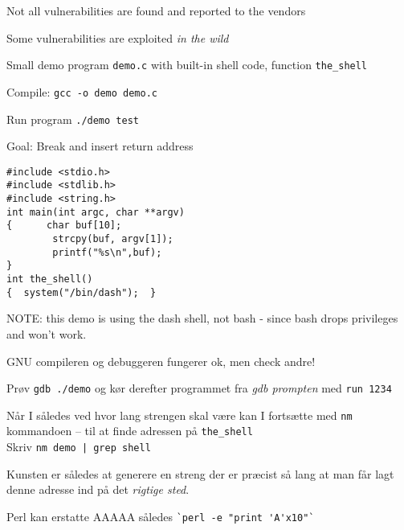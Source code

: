 \documentclass[Screen16to9,17pt]{foils}
\begin{document}
\begin{list2}
\item Not all vulnerabilities are found and reported to the vendors
\item Some vulnerabilities are exploited \emph{in the wild}
\end{list2}



\begin{list2}
\item Small demo program \verb+demo.c+ with built-in shell code, function \verb+the_shell+
\item Compile:
\verb+gcc -o demo demo.c+
\item Run program
\verb+./demo test+
\item Goal: Break and insert return address
\end{list2}

\begin{verbatim}
#include <stdio.h>
#include <stdlib.h>
#include <string.h>
int main(int argc, char **argv)
{      char buf[10];
        strcpy(buf, argv[1]);
        printf("%s\n",buf);
}
int the_shell()
{  system("/bin/dash");  }
\end{verbatim}

NOTE: this demo is using the dash shell, not bash - since bash drops privileges and won't work.


\begin{list1}
\item GNU compileren og debuggeren fungerer ok, men check andre!
\item Prøv \verb+gdb ./demo+ og kør derefter programmet fra \emph{gdb prompten}
med  \verb+run 1234+
\item Når I således ved hvor lang strengen skal være kan I fortsætte
  med \verb+nm+ kommandoen -- til at finde adressen på
  \verb+the_shell+\\
Skriv \verb+nm demo | grep shell+

\item Kunsten er således at generere en streng der er præcist så lang
  at man får lagt denne adresse ind på det \emph{rigtige sted}.
\item Perl kan erstatte AAAAA således \verb+`perl -e "print 'A'x10"`+
\end{list1}


\end{document}
